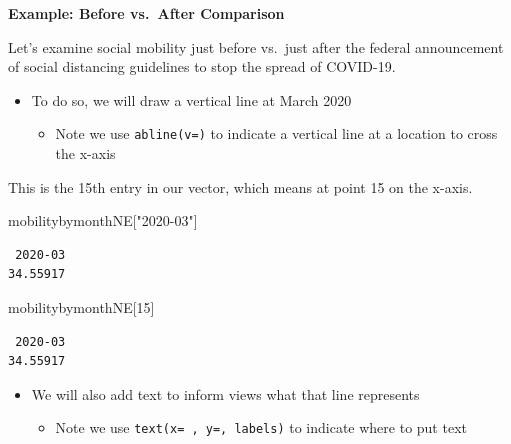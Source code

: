\documentclass[
  letterpaper,
  DIV=11,
  numbers=noendperiod]{scrreprt}
\newenvironment{Shaded}{\begin{snugshade}}{\end{snugshade}}
\newcommand{\DecValTok}[1]{\textcolor[rgb]{0.68,0.00,0.00}{#1}}
\newcommand{\NormalTok}[1]{\textcolor[rgb]{0.00,0.23,0.31}{#1}}
\newcommand{\StringTok}[1]{\textcolor[rgb]{0.13,0.47,0.30}{#1}}
\providecommand{\tightlist}{%
  \setlength{\itemsep}{0pt}\setlength{\parskip}{0pt}}\usepackage{longtable,booktabs,array}
\begin{document}
\textbf{Example: Before vs.~After Comparison}

Let's examine social mobility just before vs.~just after the federal
announcement of social distancing guidelines to stop the spread of
COVID-19.

\begin{itemize}
\tightlist
\item
  To do so, we will draw a vertical line at March 2020

  \begin{itemize}
  \tightlist
  \item
    Note we use \texttt{abline(v=)} to indicate a vertical line at a
    location to cross the x-axis
  \end{itemize}
\end{itemize}

This is the 15th entry in our vector, which means at point 15 on the
x-axis.

\begin{Shaded}
\begin{Highlighting}[]
\NormalTok{mobilitybymonthNE[}\StringTok{"2020{-}03"}\NormalTok{]}
\end{Highlighting}
\end{Shaded}

\begin{verbatim}
 2020-03 
34.55917 
\end{verbatim}

\begin{Shaded}
\begin{Highlighting}[]
\NormalTok{mobilitybymonthNE[}\DecValTok{15}\NormalTok{]}
\end{Highlighting}
\end{Shaded}

\begin{verbatim}
 2020-03 
34.55917 
\end{verbatim}

\begin{itemize}
\tightlist
\item
  We will also add text to inform views what that line represents

  \begin{itemize}
  \tightlist
  \item
    Note we use \texttt{text(x=\ ,\ y=,\ labels)} to indicate where to
    put text
  \end{itemize}
\end{itemize}
\end{document}

